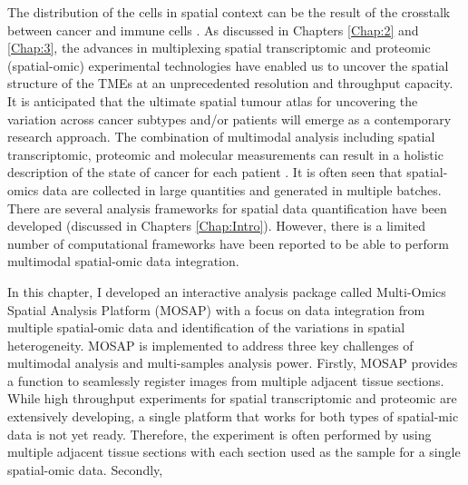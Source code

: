 The distribution of the cells in spatial context can be the result of the crosstalk between cancer and immune cells \cite{van2018spatially}. As discussed in Chapters \ref{Chap:2} and \ref{Chap:3}, the advances in multiplexing spatial transcriptomic and proteomic (spatial-omic) experimental technologies have enabled us to uncover the spatial structure of the TMEs at an unprecedented resolution and throughput capacity. It is anticipated that the ultimate spatial tumour atlas for uncovering the variation across cancer subtypes and/or patients \cite{wu2022spatial} will emerge as a contemporary research approach. The combination of multimodal analysis including spatial transcriptomic, proteomic and molecular measurements can result in a holistic description of the state of cancer for each patient \cite{boehm2022harnessing}. It is often seen that spatial-omics data are collected in large quantities and generated in multiple batches. There are several analysis frameworks for spatial data quantification have been developed (discussed in Chapters \ref{Chap:Intro}). However, there is a limited number of computational frameworks have been reported to be able to perform multimodal spatial-omic data integration. 

In this chapter, I developed an interactive analysis package called Multi-Omics Spatial Analysis Platform (MOSAP) with a focus on data integration from multiple spatial-omic data and identification of the variations in spatial heterogeneity. MOSAP is implemented to address three key challenges of multimodal analysis and multi-samples analysis power. Firstly, MOSAP provides a function to seamlessly register images from multiple adjacent tissue sections. While high throughput experiments for spatial transcriptomic and proteomic are extensively developing, a single platform that works for both types of spatial-mic data is not yet ready. Therefore, the experiment is often performed by using multiple adjacent tissue sections with each section used as the sample for a single spatial-omic data. Secondly,                


